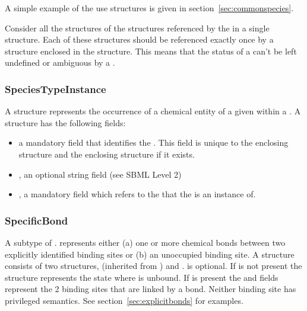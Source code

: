 \documentclass{cekarticle}
\begin{document}
A simple example of the use  structures is given in section~\ref{sec:commonspecies}.

Consider all the  structures of the 
structures referenced by the  in a single 
structure.  Each of these  structures should be referenced exactly once by a
 structure enclosed in the  structure.  This means that
the status of a  can't be left undefined or ambiguous by a .

\subsubsection{SpeciesTypeInstance}

A  structure represents the occurrence of a chemical entity of a given
 within a .  A  structure has the
following fields:

\begin{itemize}

\item {} a mandatory  field that identifies the .
This field is unique to the enclosing  structure and the enclosing
 structure if it exists.

\item {}, an optional string field (see SBML Level 2)

\item {}, a mandatory  field which refers to the 
that the  is an instance of.

\end{itemize}

\subsubsection{SpecificBond}

A subtype of .    represents either (a) one or more chemical bonds
between two explicitly identified binding sites or (b) an unoccupied binding site.  A 
structure consists of two
 structures,
 (inherited from ) and
.
 is optional.
If  is not present the  structure represents
the state where  is unbound.
If  is present the  and
 fields represent the 2 binding sites that are linked by a bond.
Neither binding site has privileged semantics.
See section~\ref{sec:explicitbonds} for examples.
\end{document}
